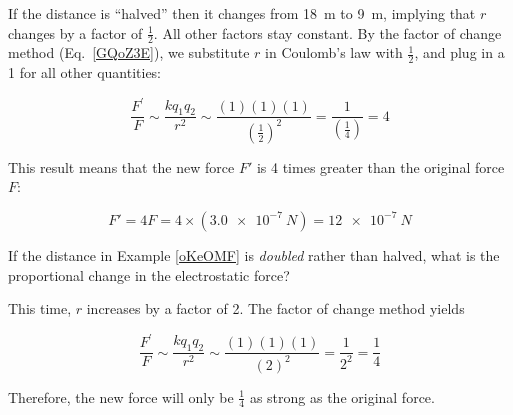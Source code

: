 \documentclass[dvipsnames]{article}
\numberwithin{equation}{section}
\numberwithin{figure}{section}
\begin{document}
\Solution If the distance is ``halved'' then it changes from \SI{18}{m} to \SI{9}{m}, implying that $r$ changes by a factor of $\frac{1}{2}$. All other factors stay constant. By the factor of change method (Eq.~\ref{GQoZ3E}), we substitute $r$ in Coulomb's law with $\frac{1}{2}$, and plug in a 1 for all other quantities:

\begin{equation*}
    \frac{F^{\prime}}{F} \sim \frac{k q_1 q_2}{r^2} \sim \frac{(1)(1)(1)}{\left(\frac{1}{2}\right)^2} = \frac{1}{\left(\frac{1}{4}\right)} = 4
\end{equation*}

This result means that the new force $F'$ is 4 times greater than the original force $F$:

\begin{equation*}
    F' = 4 F = 4 \times \left(\SI{3.0e-7}{N}\right) = \SI{12e-7}{N}
\end{equation*}

\cyanhrule

\begin{example} 
If the distance in Example \ref{oKeOMF} is \textit{doubled} rather than halved, what is the proportional change in the electrostatic force?
\end{example}

\Solution This time, $r$ increases by a factor of 2. The factor of change method yields

\begin{equation*}
    \frac{F^{\prime}}{F} \sim \frac{k q_1 q_2}{r^2} \sim \frac{(1)(1)(1)}{(2)^2} = \frac{1}{2^2} =\frac{1}{4}
\end{equation*}

Therefore, the new force will only be $\frac{1}{4}$ as strong as the original force.

\vspace{1em}
\cyanhrule
\end{document}
